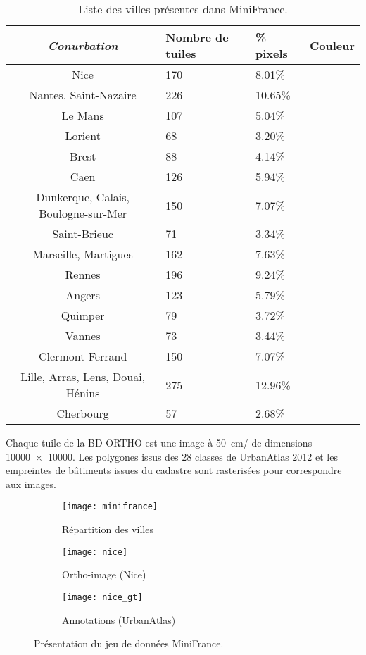 \begin{table}[h]
\caption{Liste des villes présentes dans MiniFrance.}
\label{tab:minifrance}
	\begin{tabularx}{\textwidth}{c Y Y Y}
	\toprule
	\emph{Conurbation} &  Nombre de tuiles &  \% pixels & Couleur \\
	\midrule
	Nice & 170 & \num{8.01}\% &  \\
	Nantes, Saint-Nazaire  & 226 & \num{10.65}\% &  \\
	Le Mans & 107 & \num{5.04}\% &   \\
	Lorient & 68 & \num{3.20}\%  &  \\
	Brest & 88  & \num{4.14}\% &  \\
	Caen & 126 & \num{5.94}\%  &   \\
	Dunkerque, Calais, Boulogne-sur-Mer & 150 & \num{7.07}\% &   \\
	Saint-Brieuc & 71 &  \num{3.34}\% &  \\
	Marseille, Martigues & 162 & \num{7.63}\% &  \\
	Rennes & 196 & \num{9.24}\% &  \\
	Angers & 123  & \num{5.79}\% & \\
	Quimper & 79 & \num{3.72}\% & \\
	Vannes & 73 & \num{3.44}\% & \\
	Clermont-Ferrand & 150 & \num{7.07}\% & \\
	Lille, Arras, Lens, Douai, Hénins & 275 & \num{12.96}\% & \\
	Cherbourg & 57 & \num{2.68}\% & \\ \bottomrule
	\end{tabularx}
\end{table}

Chaque tuile de la BD ORTHO est une image à \SI{50}{\centi\meter/\px} de dimensions \SI{10000x10000}{\px}. Les polygones issus des 28 classes de UrbanAtlas 2012 et les empreintes de bâtiments issues du cadastre sont rasterisées pour correspondre aux images.

\begin{figure}[h]
    \centering
    \begin{subfigure}[b]{0.3\textwidth}
        \texttt{[image: minifrance]}
        \caption*{Répartition des villes}
    \end{subfigure}
    \begin{subfigure}[b]{0.28\textwidth}
        \texttt{[image: nice]}
        \caption*{Ortho-image (Nice)}
    \end{subfigure}
    \begin{subfigure}[b]{0.28\textwidth}
        \texttt{[image: nice\_gt]}
        \caption*{Annotations (UrbanAtlas)}
    \end{subfigure}
       \caption{Présentation du jeu de données MiniFrance.}
			 \label{fig:minifrance}
\end{figure}


%
%
\printbibliography[heading=subbibliography]

